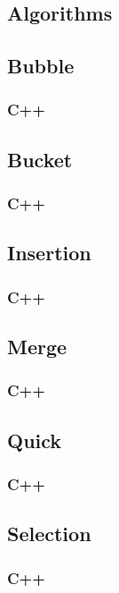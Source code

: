 \documentclass{article}
\begin{document}
\newpage
\begin{appendices}
\section{Algorithms}
\subsection{Bubble}
\label{code:bubble}
\subsubsection{C++}

\newpage
\subsection{Bucket}
\label{code:bucket}
\subsubsection{C++}

\newpage
\subsection{Insertion}
\label{code:insertion}
\subsubsection{C++}

\newpage
\subsection{Merge}
\label{code:merge}
\subsubsection{C++}

\newpage
\subsection{Quick}
\label{code:quick}
\subsubsection{C++}

\newpage
\subsection{Selection}
\label{code:selection}
\subsubsection{C++}

\end{appendices}
\end{document}
